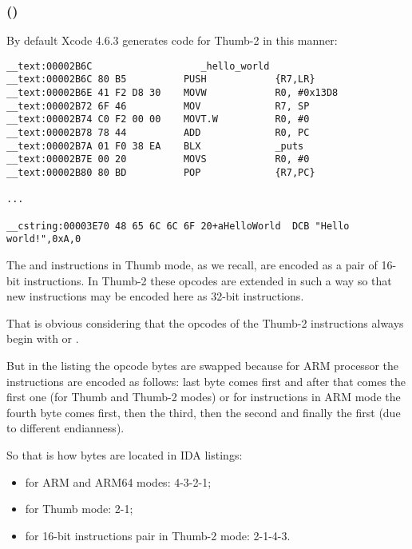 \subsubsection{\OptimizingXcodeIV (\ThumbTwoMode)}

By default Xcode 4.6.3 generates code for Thumb-2 in this manner:

\begin{lstlisting}[caption=\OptimizingXcodeIV (\ThumbTwoMode),style=customasmARM]
__text:00002B6C                   _hello_world
__text:00002B6C 80 B5          PUSH            {R7,LR}
__text:00002B6E 41 F2 D8 30    MOVW            R0, #0x13D8
__text:00002B72 6F 46          MOV             R7, SP
__text:00002B74 C0 F2 00 00    MOVT.W          R0, #0
__text:00002B78 78 44          ADD             R0, PC
__text:00002B7A 01 F0 38 EA    BLX             _puts
__text:00002B7E 00 20          MOVS            R0, #0
__text:00002B80 80 BD          POP             {R7,PC}

...

__cstring:00003E70 48 65 6C 6C 6F 20+aHelloWorld  DCB "Hello world!",0xA,0
\end{lstlisting}


\myindex{\ThumbTwoMode}

The  and  instructions in Thumb mode, as we recall, are encoded as a pair of 16-bit instructions.
In Thumb-2 these  opcodes are extended in such a way so that new instructions may be encoded here as 32-bit instructions.

That is obvious considering that the opcodes of the Thumb-2 instructions always begin with  or .

But in the \IDA listing
the opcode bytes are swapped because for ARM processor the instructions are encoded as follows: 
last byte comes first and after that comes the first one (for Thumb and Thumb-2 modes) 
or for instructions in ARM mode the fourth byte comes first, then the third,
then the second and finally the first (due to different \gls{endianness}).

So that is how bytes are located in IDA listings:
\begin{itemize}
\item for ARM and ARM64 modes: 4-3-2-1;
\item for Thumb mode: 2-1;
\item for 16-bit instructions pair in Thumb-2 mode: 2-1-4-3.
\end{itemize}

